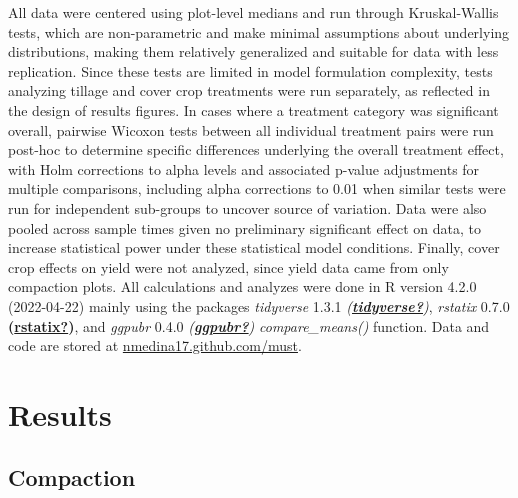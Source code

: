 \documentclass[
]{article}
\begin{document}
All data were centered using plot-level medians and run through Kruskal-Wallis tests, which are non-parametric and make minimal assumptions about underlying distributions, making them relatively generalized and suitable for data with less replication.
Since these tests are limited in model formulation complexity, tests analyzing tillage and cover crop treatments were run separately, as reflected in the design of results figures.
In cases where a treatment category was significant overall, pairwise Wicoxon tests between all individual treatment pairs were run post-hoc to determine specific differences underlying the overall treatment effect, with Holm corrections to alpha levels and associated p-value adjustments for multiple comparisons, including alpha corrections to 0.01 when similar tests were run for independent sub-groups to uncover source of variation.
Data were also pooled across sample times given no preliminary significant effect on data, to increase statistical power under these statistical model conditions.
Finally, cover crop effects on yield were not analyzed, since yield data came from only compaction plots.
All calculations and analyzes were done in R version 4.2.0 (2022-04-22) mainly using the packages \emph{tidyverse} 1.3.1 \emph{(\protect\hyperlink{ref-tidyverse}{\textbf{tidyverse?}})}, \emph{rstatix} 0.7.0 \textbf{(\protect\hyperlink{ref-rstatix}{\textbf{rstatix?}})}, and \emph{ggpubr} 0.4.0 \emph{(\protect\hyperlink{ref-ggpubr}{\textbf{ggpubr?}})} \emph{compare\_means()} function.
Data and code are stored at \url{nmedina17.github.com/must}.

\hypertarget{results}{%
\section{Results}\label{results}}

\hypertarget{compaction-1}{%
\subsection{Compaction}\label{compaction-1}}
\end{document}
